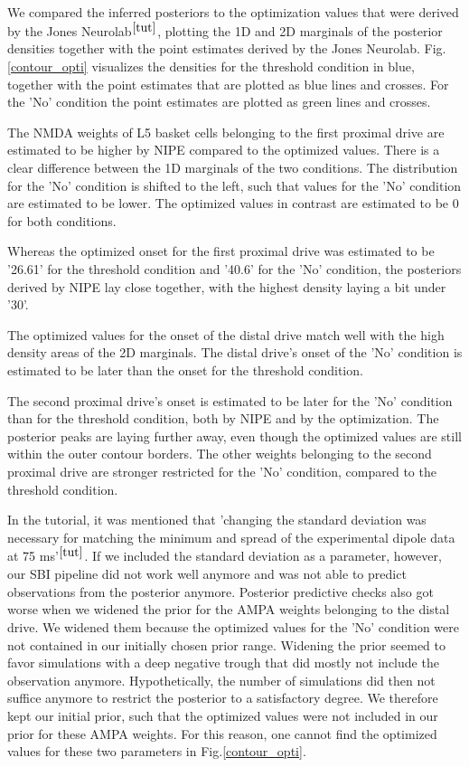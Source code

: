 \documentclass[12pt]{extreport}
\begin{document}
We compared the inferred posteriors to the optimization values that were derived by the Jones Neurolab$^{\ref{tut}}$, plotting the 1D and 2D marginals of the posterior densities together with the point estimates derived by the Jones Neurolab. Fig.\ref{contour_opti} visualizes the densities for the threshold condition in blue, together with the point estimates that are plotted as blue lines and crosses. For the 'No' condition the point estimates are plotted as green lines and crosses.

The NMDA weights of L5 basket cells belonging to the first proximal drive are estimated to be higher by NIPE compared to the optimized values. There is a clear difference between the 1D marginals of the two conditions. The distribution for the 'No' condition is shifted to the left, such that values for the 'No' condition are estimated to be lower. The optimized values in contrast are estimated to be 0 for both conditions.

Whereas the optimized onset for the first proximal drive was estimated to be '26.61' for the threshold condition and '40.6' for the 'No' condition, the posteriors derived by NIPE lay close together, with the highest density laying a bit under '30'. 

The optimized values for the onset of the distal drive match well with the high density areas of the 2D marginals. The distal drive's onset of the 'No' condition is estimated to be later than the onset for the threshold condition.

The second proximal drive's onset is estimated to be later for the 'No' condition than for the threshold condition, both by NIPE and by the optimization. The posterior peaks are laying further away, even though the optimized values are still within the outer contour borders. The other weights belonging to the second proximal drive are stronger restricted for the 'No' condition, compared to the threshold condition.

In the tutorial, it was mentioned that 'changing the standard deviation was necessary for matching the minimum and spread of the experimental dipole data at 75 ms'$^{\ref{tut} }$. If we included the standard deviation as a parameter, however, our SBI pipeline did not work well anymore and was not able to predict observations from the posterior anymore. Posterior predictive checks also got worse when we widened the prior for the AMPA weights belonging to the distal drive. We widened them because the optimized values for the 'No' condition were not contained in our initially chosen prior range. Widening the prior seemed to favor simulations with a deep negative trough that did mostly not include the observation anymore. Hypothetically, the number of simulations did then not suffice anymore to restrict the posterior to a satisfactory degree. We therefore kept our initial prior, such that the optimized values were not included in our prior for these AMPA weights. For this reason, one cannot find the optimized values for these two parameters in Fig.\ref{contour_opti}.\\
\end{document}
